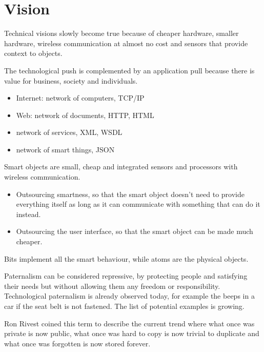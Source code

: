 \section{Vision}
\begin{myremark}Technical visions slowly become true because of cheaper hardware, smaller hardware, wireless communication at almost no cost and sensors that provide context to objects.
\end{myremark}

\begin{mytitle} The technological push is complemented by an application pull because there is value for business, society and individuals.
\end{mytitle}
\begin{mytitle}\hfill
\begin{itemize}
    \item Internet: network of computers, TCP/IP
    \item Web: network of documents, HTTP, HTML
    \item network of services, XML, WSDL
    \item network of smart things, JSON
\end{itemize}
\end{mytitle}
\begin{mytitle} Smart objects are small, cheap and integrated sensors and processors with wireless communication.
\end{mytitle}
\newpage
\begin{mytitle}\hfill
\begin{itemize}
    \item Outsourcing smartness, so that the smart object doesn't need to provide everything itself as long as it can communicate with something that can do it instead.
    \item Outsourcing the user interface, so that the smart object can be made much cheaper.
\end{itemize}
\end{mytitle}
\begin{mytitle} Bits implement all the smart behaviour, while atoms are the physical objects.
\end{mytitle}
\begin{mytitle} Paternalism can be considered repressive, by protecting people and satisfying their needs but without allowing them any freedom or responsibility. Technological paternalism is already observed today, for example the beeps in a car if the seat belt is not fastened. The list of potential examples is growing.
\end{mytitle}
\begin{mytitle} Ron Rivest coined this term to describe the current trend where what once was private is now public, what once was hard to copy is now trivial to duplicate and what once was forgotten is now stored forever.
\end{mytitle}
